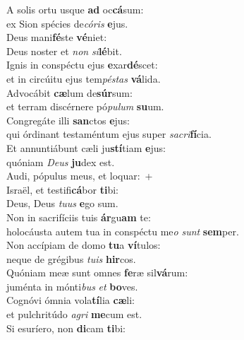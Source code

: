 \evenverse A solis ortu usque \textbf{ad} oc\textbf{cá}sum:~\*\\
\evenverse ex Sion spécies de\textit{có}\textit{ris} \textbf{e}jus.\\
\oddverse Deus mani\textbf{fé}ste \textbf{vé}niet:~\*\\
\oddverse Deus noster et \textit{non} \textit{si}\textbf{lé}bit.\\
\evenverse Ignis in conspéctu ejus \textbf{e}xar\textbf{dé}scet:~\*\\
\evenverse et in circúitu ejus tem\textit{pé}\textit{stas} \textbf{vá}lida.\\
\oddverse Advocábit \textbf{cæ}lum de\textbf{súr}sum:~\*\\
\oddverse et terram discérnere pó\textit{pu}\textit{lum} \textbf{su}um.\\
\evenverse Congregáte illi \textbf{san}ctos \textbf{e}jus:~\*\\
\evenverse qui órdinant testaméntum ejus super \textit{sa}\textit{cri}\textbf{fí}cia.\\
\oddverse Et annuntiábunt cæli ju\textbf{stí}tiam \textbf{e}jus:~\*\\
\oddverse quóniam \textit{De}\textit{us} \textbf{ju}dex est.\\
\evenverse Audi, pópulus meus, et loquar:~+\\
\evenverse  Israël, et testifi\textbf{cá}bor \textbf{ti}bi:~\*\\
\evenverse Deus, Deus \textit{tu}\textit{us} \textbf{e}go sum.\\
\oddverse Non in sacrifíciis tuis \textbf{ár}gu\textbf{am} te:~\*\\
\oddverse holocáusta autem tua in conspéctu me\textit{o} \textit{sunt} \textbf{sem}per.\\
\evenverse Non accípiam de domo \textbf{tu}a \textbf{ví}tulos:~\*\\
\evenverse neque de grégibus \textit{tu}\textit{is} \textbf{hir}cos.\\
\oddverse Quóniam meæ sunt omnes \textbf{fe}ræ sil\textbf{vá}rum:~\*\\
\oddverse juménta in mónti\textit{bus} \textit{et} \textbf{bo}ves.\\
\evenverse Cognóvi ómnia vola\textbf{tí}lia \textbf{cæ}li:~\*\\
\evenverse et pulchritúdo \textit{a}\textit{gri} \textbf{me}cum est.\\
\oddverse Si esuríero, non \textbf{di}cam \textbf{ti}bi:~\*\\
